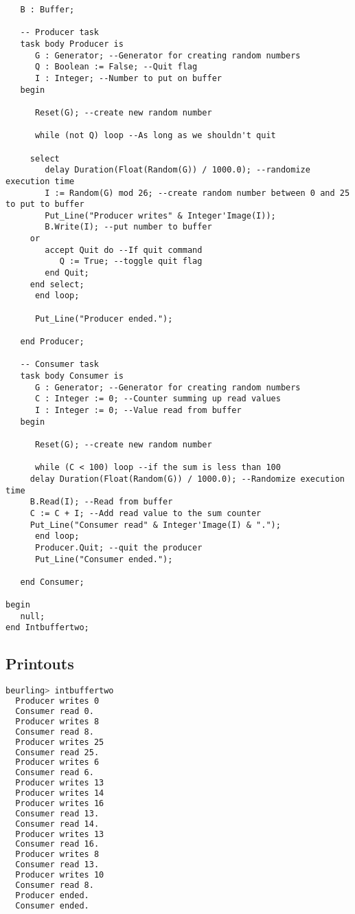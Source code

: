 \documentclass[a4paper,10pt]{article}
\begin{document}
\begin{lstlisting}
   B : Buffer;
   
   -- Producer task
   task body Producer is 
      G : Generator; --Generator for creating random numbers
      Q : Boolean := False; --Quit flag
      I : Integer; --Number to put on buffer
   begin
      
      Reset(G); --create new random number
      
      while (not Q) loop --As long as we shouldn't quit 
	 
	 select
	    delay Duration(Float(Random(G)) / 1000.0); --randomize execution time
	    I := Random(G) mod 26; --create random number between 0 and 25 to put to buffer
	    Put_Line("Producer writes" & Integer'Image(I));
	    B.Write(I); --put number to buffer
	 or
	    accept Quit do --If quit command
	       Q := True; --toggle quit flag
	    end Quit;
	 end select;
      end loop;
      
      Put_Line("Producer ended.");
      
   end Producer;
   
   -- Consumer task
   task body Consumer is 
      G : Generator; --Generator for creating random numbers
      C : Integer := 0; --Counter summing up read values
      I : Integer := 0; --Value read from buffer
   begin
      
      Reset(G); --create new random number
      
      while (C < 100) loop --if the sum is less than 100
	 delay Duration(Float(Random(G)) / 1000.0); --Randomize execution time
	 B.Read(I); --Read from buffer
	 C := C + I; --Add read value to the sum counter
	 Put_Line("Consumer read" & Integer'Image(I) & ".");
      end loop;
      Producer.Quit; --quit the producer
      Put_Line("Consumer ended.");
      
   end Consumer;
   
begin
   null;
end Intbuffertwo;
\end{lstlisting}

\subsection{Printouts}

\begin{lstlisting}[language=Bash]
  beurling> intbuffertwo 
  Producer writes 0
  Consumer read 0.
  Producer writes 8
  Consumer read 8.
  Producer writes 25
  Consumer read 25.
  Producer writes 6
  Consumer read 6.
  Producer writes 13
  Producer writes 14
  Producer writes 16
  Consumer read 13.
  Consumer read 14.
  Producer writes 13
  Consumer read 16.
  Producer writes 8
  Consumer read 13.
  Producer writes 10
  Consumer read 8.
  Producer ended.
  Consumer ended.
\end{lstlisting}
\end{document}

